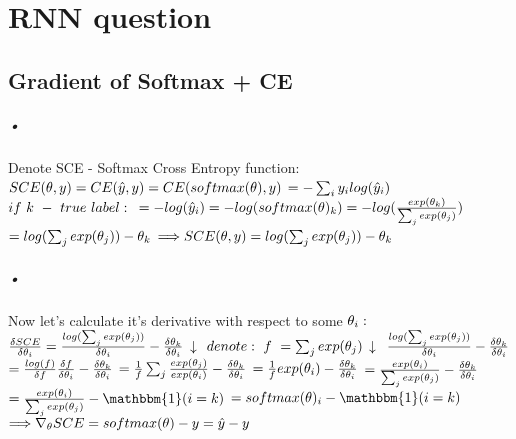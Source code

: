 \documentclass{article}
\begin{document}
\section{RNN question}
\subsection{Gradient of Softmax + CE}
\subparagraph{•}
Denote SCE - Softmax Cross Entropy function:\\
$SCE(\theta, y) = CE(\hat{y}, y) = CE(softmax(\theta), y) \\$
$= -\sum_{i} y_i log(\hat{y}_i)\\$
$if \ k \ - \ true \ label:\\$
$= - log(\hat{y}_i) = -log(softmax(\theta)_k) = -log(\frac{exp(\theta_k)}{\sum_{j}exp(\theta_j)})\\$
$= log(\sum_{j}exp(\theta_j))-\theta_k\\$
$\Longrightarrow SCE(\theta, y) = log(\sum_{j}exp(\theta_j))-\theta_k\\$

\subparagraph{•}
Now let's calculate it's derivative with respect to some $\theta_i:\\$
$\frac{\delta SCE}{\delta \theta_i} = \frac{log(\sum_{j}exp(\theta_j))}{\delta \theta_i} -\frac{\delta \theta_k}{\delta \theta_i}\\$
$\downarrow \\$
$denote: \ f \ = \sum_{j}exp(\theta_j)\\ $
$\downarrow \\$
$\frac{log(\sum_{j}exp(\theta_j))}{\delta \theta_i} -\frac{\delta \theta_k}{\delta \theta_i}\\$
$= \frac{log(f)}{\delta f}\frac{\delta f}{\delta \theta_i} -\frac{\delta \theta_k}{\delta \theta_i}\\$
$= \frac{1}{f} \sum_{j} \frac{exp(\theta_j)}{exp(\theta_i)} -\frac{\delta \theta_k}{\delta \theta_i}\\$
$= \frac{1}{f} exp(\theta_i) -\frac{\delta \theta_k}{\delta \theta_i}\\$
$= \frac{exp(\theta_i)}{\sum_{j} exp(\theta_j)}-\frac{\delta \theta_k}{\delta \theta_i}\\$
$= \frac{exp(\theta_i)}{\sum_{j} exp(\theta_j)} - \mathbbm{1}(i=k)\\$
$= softmax(\theta)_i - \mathbbm{1}(i=k)\\$
$\Longrightarrow \nabla_\theta SCE = softmax(\theta) - y = \hat{y}-y\\$ 
\end{document}

